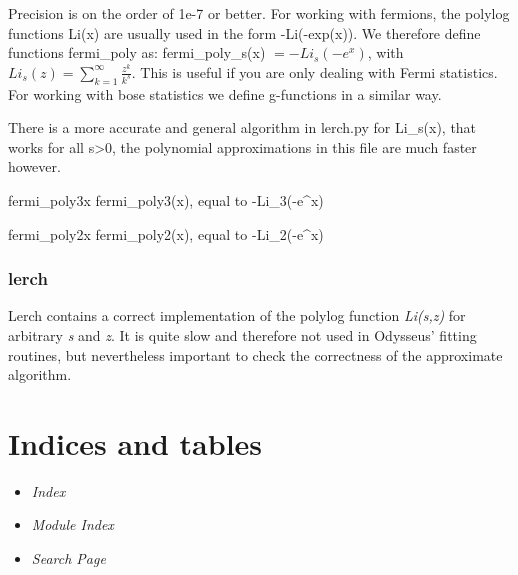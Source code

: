 \documentclass[letterpaper,10pt,english]{manual}
\begin{document}
Precision is on the order of 1e-7 or better. For working with fermions, the
polylog functions Li(x) are usually used in the form -Li(-exp(x)). We therefore
define functions fermi\_poly as:
fermi\_poly\_s(x) $=-Li_s(-e^x)$,
with $Li_s(z)=\sum_{k=1}^{\infty}\frac{z^k}{k^s}$.
This is useful if you are only dealing with Fermi statistics. For working with
bose statistics we define g-functions in a similar way.

There is a more accurate and general algorithm in lerch.py for Li\_s(x),
that works for all s\textgreater{}0, the polynomial approximations in this file are much
faster however.

\hypertarget{odysseus.polylog.fermi_poly3}{}\begin{funcdesc}{fermi\_poly3}{x}
fermi\_poly3(x), equal to -Li\_3(-e\textasciicircum{}x)
\end{funcdesc}

\hypertarget{odysseus.polylog.fermi_poly2}{}\begin{funcdesc}{fermi\_poly2}{x}
fermi\_poly2(x), equal to -Li\_2(-e\textasciicircum{}x)
\end{funcdesc}


\subsection{lerch}

Lerch contains a correct implementation of the polylog function \emph{Li(s,z)} for arbitrary \emph{s} and \emph{z}. It is quite slow and therefore not used in Odysseus' fitting routines, but nevertheless important to check the correctness of the approximate algorithm.


\chapter{Indices and tables}
\begin{itemize}
\item {} 
\emph{Index}

\item {} 
\emph{Module Index}

\item {} 
\emph{Search Page}

\end{itemize}


\renewcommand{\indexname}{Module Index}
\printmodindex
\renewcommand{\indexname}{Index}
\printindex
\end{document}
